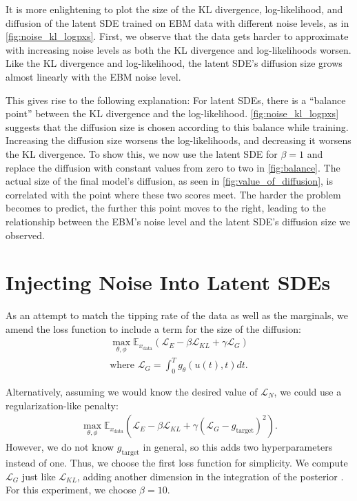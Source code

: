 \documentclass[twoside,11pt]{article}
\begin{document}
It is more enlightening to plot the size of the KL divergence, log-likelihood, and diffusion of the latent SDE trained on EBM data with different noise levels, as in \cref{fig:noise_kl_logpxs}. First, we observe that the data gets harder to approximate with increasing noise levels as both the KL divergence and log-likelihoods worsen. Like the KL divergence and log-likelihood, the latent SDE's diffusion size grows almost linearly with the EBM noise level.

This gives rise to the following explanation: For latent SDEs, there is a \enquote{balance point} between the KL divergence and the log-likelihood. \cref{fig:noise_kl_logpxs} suggests that the diffusion size is chosen according to this balance while training. Increasing the diffusion size worsens the log-likelihoods, and decreasing it worsens the KL divergence. To show this, we now use the latent SDE for \(\beta=1\) and replace the diffusion with constant values from zero to two in \cref{fig:balance}. The actual size of the final model's diffusion, as seen in \cref{fig:value_of_diffusion}, is correlated with the point where these two scores meet. The harder the problem becomes to predict, the further this point moves to the right, leading to the relationship between the EBM's noise level and the latent SDE's diffusion size we observed.


\section{Injecting Noise Into Latent SDEs}
\label{sec:noise}

As an attempt to match the tipping rate of the data as well as the marginals, we amend the loss function to include a term for the size of the diffusion:
\begin{align*}
    \max_{\theta, \phi} \mathbb{E}_{x_{\text{data}}} (\mathcal{L}_E - \beta \mathcal{L}_{KL} + \gamma \mathcal{L}_G) \\
    \text{where } \mathcal{L}_G = \int_0^T g_{\theta}(u(t), t) dt.
\end{align*}

Alternatively, assuming we would know the desired value of \(\mathcal{L}_N\), we could use a regularization-like penalty:
\begin{align*}
    \max_{\theta, \phi} \mathbb{E}_{x_{\text{data}}} (\mathcal{L}_E - \beta \mathcal{L}_{KL} + \gamma (\mathcal{L}_G - g_{\text{target}})^2).
\end{align*}
However, we do not know \(g_{\text{target}}\) in general, so this adds two hyperparameters instead of one. Thus, we choose the first loss function for simplicity. We compute \(\mathcal{L}_G\) just like \(\mathcal{L}_{KL}\), adding another dimension in the integration of the posterior \cite[][cf.]{li2020scalable}. For this experiment, we choose \(\beta=10\).
\end{document}
